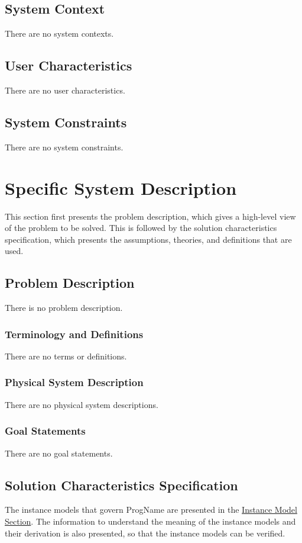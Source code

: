 \documentclass[12pt]{article}
\begin{document}
\subsection{System Context}
\label{Sec:SysContext}
There are no system contexts.

\subsection{User Characteristics}
\label{Sec:UserChars}
There are no user characteristics.

\subsection{System Constraints}
\label{Sec:SysConstraints}
There are no system constraints.

\section{Specific System Description}
\label{Sec:SpecSystDesc}
This section first presents the problem description, which gives a high-level view of the problem to be solved. This is followed by the solution characteristics specification, which presents the assumptions, theories, and definitions that are used.

\subsection{Problem Description}
\label{Sec:ProbDesc}
There is no problem description.

\subsubsection{Terminology and Definitions}
\label{Sec:TermDefs}
There are no terms or definitions.

\subsubsection{Physical System Description}
\label{Sec:PhysSyst}
There are no physical system descriptions.

\subsubsection{Goal Statements}
\label{Sec:GoalStmt}
There are no goal statements.

\subsection{Solution Characteristics Specification}
\label{Sec:SolCharSpec}
The instance models that govern ProgName are presented in the \hyperref[Sec:IMs]{Instance Model Section}. The information to understand the meaning of the instance models and their derivation is also presented, so that the instance models can be verified.
\end{document}
